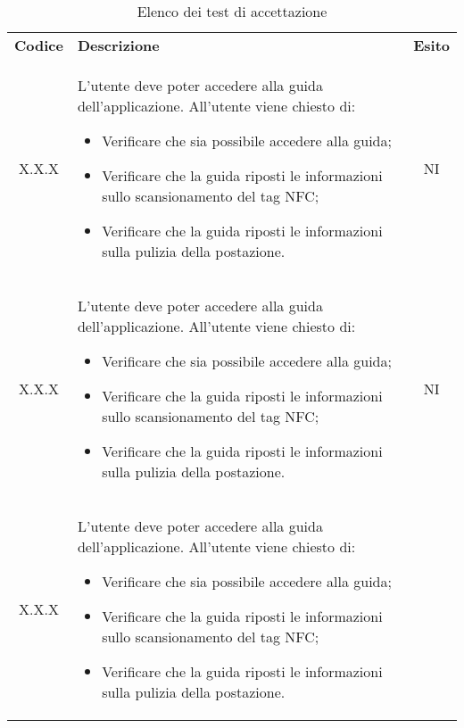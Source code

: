 {
    \renewcommand{\arraystretch}{1.5}
    \centering
    \begin{longtable}{ c C{10cm} c }
        \caption{Elenco dei test di accettazione}\\
        \rowcolor{\primaryColor}
        \textcolor{\secondaryColor}{
        \textbf{Codice}}     & \textcolor{\secondaryColor}
        {\textbf{Descrizione}} & \textcolor{\secondaryColor}{\textbf{Esito}} \\


        X.X.X&
        L'utente deve poter accedere alla guida dell'applicazione.\newline
        All'utente viene chiesto di:
        \begin{itemize}
            \item Verificare che sia possibile accedere alla guida;
            \item Verificare che la guida riposti le informazioni sullo scansionamento del tag NFC;
            \item Verificare che la guida riposti le informazioni sulla pulizia della postazione.
        \end{itemize}&
        NI\\
        X.X.X&
        L'utente deve poter accedere alla guida dell'applicazione.\newline
        All'utente viene chiesto di:
        \begin{itemize}
            \item Verificare che sia possibile accedere alla guida;
            \item Verificare che la guida riposti le informazioni sullo scansionamento del tag NFC;
            \item Verificare che la guida riposti le informazioni sulla pulizia della postazione.
        \end{itemize}&
        NI\\
        X.X.X&
        L'utente deve poter accedere alla guida dell'applicazione.\newline
        All'utente viene chiesto di:
        \begin{itemize}
            \item Verificare che sia possibile accedere alla guida;
            \item Verificare che la guida riposti le informazioni sullo scansionamento del tag NFC;
            \item Verificare che la guida riposti le informazioni sulla pulizia della postazione.

\end{itemize}
\end{longtable}}
